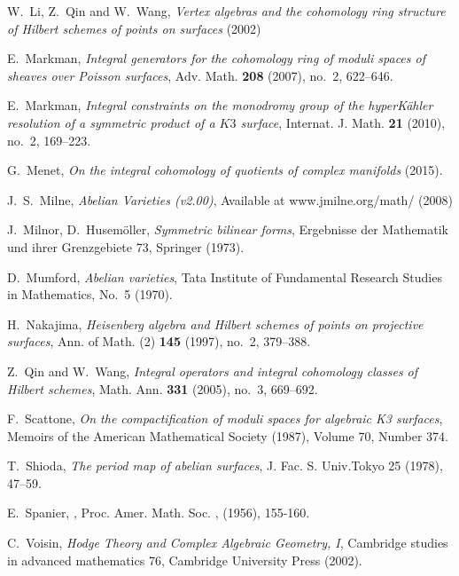 \begin{thebibliography}{10}
W.~Li, Z.~Qin and W.~Wang, \emph{Vertex algebras and the cohomology ring structure of 
  Hilbert schemes of points on surfaces} (2002)

E.~Markman, \emph{Integral generators for the cohomology ring of moduli spaces of
  sheaves over Poisson surfaces}, Adv. Math. \textbf{208} (2007), no.~2,
  622--646.

E.~Markman, \emph{Integral constraints on the monodromy group of the
  hyper{K}\"ahler resolution of a symmetric product of a {$K3$} surface},
  Internat. J. Math. \textbf{21} (2010), no.~2, 169--223.

G.~Menet, \emph{On the integral cohomology of quotients of complex manifolds} (2015).

J.~S.~Milne, \emph{Abelian Varieties (v2.00)}, Available at www.jmilne.org/math/ (2008)  

J.~Milnor, D.~Husem\"oller, \emph{Symmetric bilinear forms}, Ergebnisse der Mathematik
  und ihrer Grenzgebiete 73, Springer (1973).

D.~Mumford, \emph{Abelian varieties}, Tata Institute of Fundamental Research Studies in Mathematics, 
  No.~5 (1970).

H.~Nakajima, \emph{Heisenberg algebra and Hilbert schemes of points on
  projective surfaces}, Ann. of Math. (2) \textbf{145} (1997), no.~2, 379--388.

Z.~Qin and W.~Wang, \emph{Integral operators and integral cohomology classes of
  {H}ilbert schemes}, Math. Ann. \textbf{331} (2005), no.~3, 669--692.

F.~Scattone, \emph{On the compactification of moduli spaces for algebraic K3 surfaces},
  Memoirs of the American Mathematical Society (1987), Volume 70, Number 374.

T.~Shioda, \emph{The period map of abelian surfaces}, J. Fac. S. Univ.Tokyo 25 (1978), 47--59.

E.~Spanier, 
,
\newblock Proc. Amer. Math. Soc.
, (1956), 155-160.

C.~Voisin, \emph{Hodge Theory and Complex Algebraic Geometry, I},
  Cambridge studies in advanced mathematics 76, Cambridge University Press (2002).

\end{thebibliography}